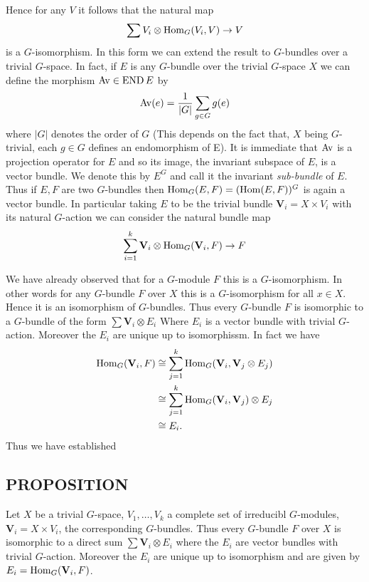 Hence for any $V$ it follows that the natural map
\begin{equation*}
    \sum V_i \otimes \operatorname{Hom}_G(V_i, V) \to V
\end{equation*}
is a $G$-isomorphism. In this form we can extend the result to $G$-bundles over a trivial $G$-space. In fact, if $E$ is any $G$-bundle over the trivial $G$-space $X$ we can define the morphism $\operatorname{Av} \in \operatorname{END} E$ by
\begin{equation*}
    \operatorname{Av}(e) = \frac{1}{|G|} \sum_{g \in G} g(e)
\end{equation*}
where $|G|$ denotes the order of $G$ (This depends on the fact that, $X$ being $G$-trivial, each $g \in G$ defines an endomorphism of E). It is immediate that $\operatorname{Av}$ is a projection operator for $E$ and so its image, the invariant subspace of $E$, is a vector bundle. We denote this by $E^G$ and call it the invariant \textit{sub-bundle} of $E$. Thus if $E, F$ are two $G$-bundles then $\operatorname{Hom}_G(E, F) = (\operatorname{Hom}(E, F))^G$ is again a vector bundle. In particular taking $E$ to be the trivial bundle $\textbf{V}_i = X \times V_i$ with its natural $G$-action we can consider the natural bundle map
\begin{equation*}
    \sum_{i=1}^k \textbf{V}_i \otimes \operatorname{Hom}_G(\textbf{V}_i, F) \to F
\end{equation*} \par 

We have already observed that for a $G$-module $F$ this is a $G$-isomorphism. In other words for any $G$-bundle $F$ over $X$ this is a $G$-isomorphism for all $x \in X$. Hence it is an isomorphism of $G$-bundles. Thus every $G$-bundle $F$ is isomorphic to a $G$-bundle of the form $\sum \textbf{V}_i \otimes E_i$ Where $E_i$ is a vector bundle with trivial $G$-action. Moreover the $E_i$ are unique up to isomorphissm. In fact we have
\begin{align*}
    \operatorname{Hom}_G(\textbf{V}_i, F) & \cong \sum_{j=1}^k  \operatorname{Hom}_G(\textbf{V}_i, \textbf{V}_j \otimes E_j) \\
    & \cong \sum_{j=1}^k  \operatorname{Hom}_G(\textbf{V}_i, \textbf{V}_j) \otimes E_j \\
    & \cong E_i.
\end{align*}
Thus we have established

\subsection{PROPOSITION} \label{prop:1.6.2} Let $X$ be a trivial $G$-space, $V_1, \ldots, V_k$ a complete set of irreducibl $G$-modules, $\textbf{V}_i = X \times V_i$, the corresponding $G$-bundles. Thus every $G$-bundle $F$ over $X$ is isomorphic to a direct sum $\sum \textbf{V}_i \otimes E_i$ where the $E_i$ are vector bundles with trivial $G$-action. Moreover the $E_i$ are unique up to isomorphism and are given by $E_i = \operatorname{Hom}_G(\textbf{V}_i, F)$.
